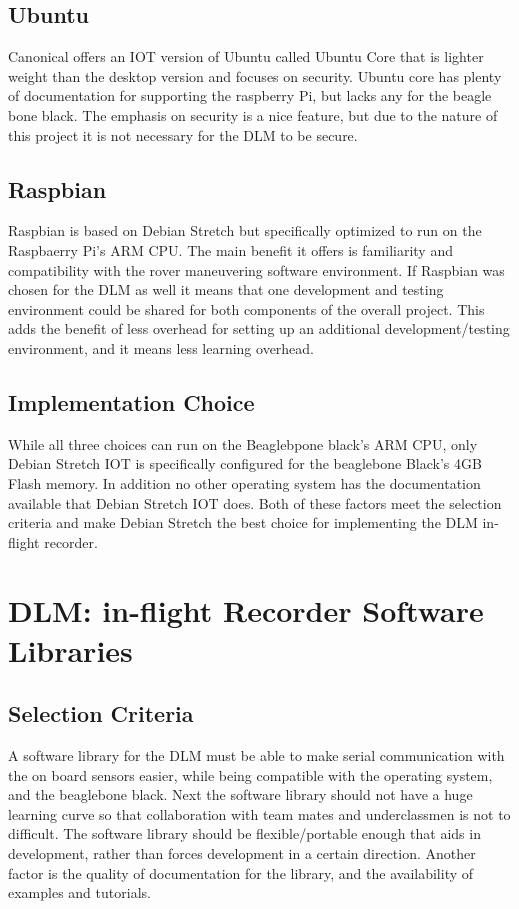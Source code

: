 \documentclass[onecolumn, draftclsnofoot,10pt, compsoc]{IEEEtran}
\begin{document}
\subsection{Ubuntu}
 Canonical offers an IOT version of Ubuntu called Ubuntu Core that is lighter weight than the desktop version and focuses on security. Ubuntu core has plenty of documentation for supporting the raspberry Pi, but lacks any for the beagle bone black. The emphasis on security is a nice feature, but due to the nature of this project it is not necessary for the DLM to be secure.
\subsection{Raspbian}
Raspbian is based on Debian Stretch but specifically optimized to run on the Raspbaerry Pi's ARM CPU. The main benefit it offers is familiarity and compatibility with the rover maneuvering software environment. If Raspbian was chosen for the DLM as well it means that one development and testing environment could be shared for both components of the overall project. This adds the benefit of less overhead for setting up an additional development/testing environment, and it means less learning overhead.
\subsection{Implementation Choice}
While all three choices can run on the Beaglebpone black's ARM CPU, only Debian Stretch IOT is specifically configured for the beaglebone Black's 4GB Flash memory. In addition no other operating system has the documentation available that Debian Stretch IOT does. Both of these factors meet the selection criteria and make Debian Stretch the best choice for implementing the DLM in-flight recorder.
\section{DLM: in-flight Recorder Software Libraries}
\subsection{Selection Criteria}
A software library for the DLM must be able to make serial communication with the on board sensors easier, while being compatible with the operating system, and the beaglebone black. Next the software library should not have a huge learning curve so that collaboration with team mates and underclassmen is not to difficult. The software library should be flexible/portable enough that aids in development, rather than forces development in a certain direction. Another factor is the quality of documentation for the library, and the availability of examples and tutorials.
\end{document}
